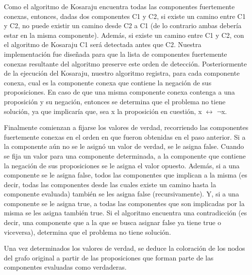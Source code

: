 Como el algoritmo de Kosaraju encuentra todas las componentes fuertemente conexas, entonces, dadas dos componentes C1 y C2, si existe un camino entre C1 y C2, no puede existir un camino desde C2 a C1 (de lo contrario ambas debería estar en la misma componente). Además, si existe un camino entre C1 y C2, con el algoritmo de Kosaraju C1 será detectada antes que C2. Nuestra implementación fue diseñada para que la lista de componentes fuertemente conexas resultante del algoritmo preserve este orden de detección. Posteriormente de la ejecución del Kosaraju, nuestro algoritmo registra, para cada componente conexa, cual es la componente conexa que contiene la negación de sus proposiciones. En caso de que una misma componente conexa contenga a una proposición y su negación, entonces se determina que el problema no tiene solución, ya que implicaría que, sea x la proposición en cuestión, x $\leftrightarrow$ $\lnot$x.

Finalmente comienzan a fijarse los valores de verdad, recorriendo las componentes fuertemente conexas en el orden en que fueron obtenidas en el paso anterior. Si a la componente aún no se le asignó un valor de verdad, se le asigna false. Cuando se fija un valor para una componente determinada, a la componente que contiene la negación de sus proposiciones se le asigna el valor opuesto.  Además, si a una componente se le asigna false, todos las componentes que implican a la misma (es decir, todas las componentes desde las cuales existe un camino hasta la componente evaluada) también se les asigna false (recursivamente). Y, si a una componente se le asigna true, a todas las componentes que son implicadas por la misma se  les asigna también true. Si el algoritmo encuentra una contradicción (es decir, una componente que a la que se busca  asignar false ya tiene true o viceversa), determina que el problema no tiene solución.

Una vez determinados los valores de verdad, se deduce la coloración de los nodos del grafo original a partir de las proposiciones que forman parte de las componentes evaluadas como verdaderas.

\begin{algorithmic} 
\newcommand{\INDSTATE}[1][1]{\STATE\hspace{#1\algorithmicindent}}
	\INDSTATE[2]{GrafoDirigido = crearGrafoDirigidoConProposiciones(grafo_original)}
	\INDSTATE[2]{ListaComponentesConexas =  Kosaraju(GrafoDirigido)}
	\INDSTATE[2]{GrafoCompacto = generarGrafoCompacto(ListaComponentesConexas)
	\INDSTATE[4]{Si GrafoCompacto es INVALIDO}
		\INDSTATE[6]{Devolver NO_HAY_SOLUCION}

	\INDSTATE[4]{asignacionDeVerdad = AsignarValoresDeVerdad(ListaComponentesConexas,GrafoCompacto)}
	\INDSTATE[4]{Si asignacionDeVerdad==INVALIDO}
		\INDSTATE[6]{Devolver NO_HAY_SOLUCION}

	\INDSTATE[4]{Devolver ObtenerColoreoParaGrafoOriginal(ListaComponentesConexas)}
 \STATE Fin
\end{algorithmic} 

